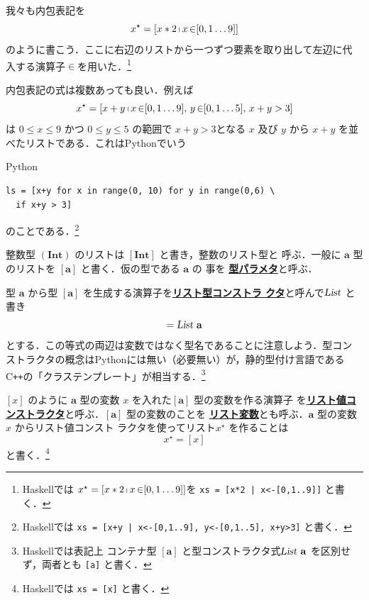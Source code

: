 \documentclass[a5paper,twoside,fleqn,draft]{jsbook}
\newcommand{\programminglanguage}[1]{\textsf{#1}}
\newcommand{\cxx}{\programminglanguage{C}\texttt{++}}
\newcommand{\haskell}{\programminglanguage{Haskell}}
\newcommand{\python}{\programminglanguage{Python}}
\newcommand{\keyword}[1]{{\underline{\textbf{#1}}}}
\newcommand{\code}[1]{\texttt{#1}}
\newenvironment{pythoncode}{\begin{itembox}[r]{\python}}{\end{itembox}}
\DeclareMathOperator{\mFrom}{\in}
\newcommand{\mType}[1]{\mathbf{#1}} %
\newcommand{\mA}{\mType{a}}
\newcommand{\mIntType}{\mType{Int}}
\newcommand{\mTypeConstructor}[1]{\textsl{#1}}
\DeclareMathOperator{\mListTypeConstructor}{\mTypeConstructor{List}}
\newcommand{\mList}[1]{{#1}^\mathrm{\star}}
\DeclareMathOperator{\mListComp}{\shortmid}
\begin{document}
我々も内包表記を
\begin{equation}
  \mList{x}
  =[x*2\mListComp x\mFrom[0,1\dots9]]
\end{equation}
のように書こう．ここに右辺のリストから一つずつ要素を取り出して左辺に代
入する演算子$\mFrom$を用いた．\footnote{\haskell では
  $\mList{x}=[x*2\mListComp x\mFrom[0,1\dots9]]$を \code{xs = [x*2 |
      x<-[0,1..9]]} と書く．}

内包表記の式は複数あっても良い．例えば
\begin{equation}
  \mList{x}
  =[x+y\mListComp x\mFrom[0,1\dots9],\,y\mFrom[0,1\dots5],\,x+y>3]
\end{equation}
は $0\le x\le9$ かつ $0\le y\le5$ の範囲で $x+y>3$となる $x$ 及び $y$
から $x+y$ を並べたリストである．これは\python でいう
\begin{pythoncode}
\begin{verbatim}
ls = [x+y for x in range(0, 10) for y in range(0,6) \
  if x+y > 3]
\end{verbatim}
\end{pythoncode}
のことである．\footnote{\haskell では \code{xs = [x+y | x<-[0,1..9],
      y<-[0,1..5], x+y>3]} と書く．}


整数型 $(\mIntType)$ のリストは $[\mIntType]$ と書き，整数のリスト型と
呼ぶ．一般に $\mA$ 型のリストを $[\mA]$ と書く．仮の型である $\mA$ の
事を \keyword{型パラメタ}と呼ぶ．

型 $\mA$ から型 $[\mA]$ を生成する演算子を\keyword{リスト型コンストラ
  クタ}と呼んで$\mListTypeConstructor$ と書き
\begin{equation}
  [\mA]
  =\mListTypeConstructor\,\mA
\end{equation}
とする．この等式の両辺は変数ではなく型名であることに注意しよう．型コン
ストラクタの概念は\python には無い（必要無い）が，静的型付け言語である
\cxx の「クラステンプレート」が相当する．\footnote{\haskell では表記上
  コンテナ型 $[\mA]$ と型コンストラクタ式$\mListTypeConstructor\,\mA $
  を区別せず，両者とも \code{[a]} と書く．}

$[x]$ のように $\mA$ 型の変数 $x$ を入れた$[\mA]$ 型の変数を作る演算子
を\keyword{リスト値コンストラクタ}と呼ぶ．$[\mA]$ 型の変数のことを
\keyword{リスト変数}とも呼ぶ．$\mA$ 型の変数 $x$ からリスト値コンスト
ラクタを使ってリスト$\mList{x}$ を作ることは
\begin{equation}
  \mList{x}
  =[x]
\end{equation}
と書く．\footnote{\haskell では \code{xs = [x]} と書く．}
\end{document}

